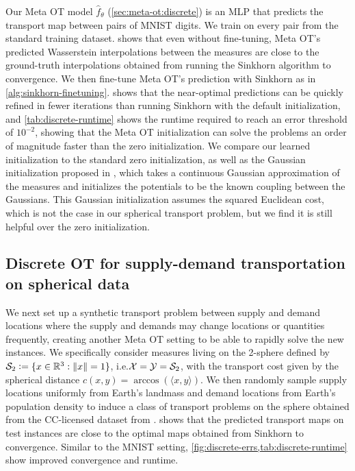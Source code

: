 \documentclass{article}
\newcommand{\ie}{i.e.\xspace}
\newcommand{\defeq}{\vcentcolon=}
\begin{document}
Our Meta OT model $\hat f_\theta$ (\cref{sec:meta-ot:discrete})
is an MLP that predicts the transport map between pairs of MNIST digits.
We train on every pair from the standard training dataset.
 shows that even without fine-tuning,
Meta OT's predicted Wasserstein interpolations between
the measures are close to the ground-truth interpolations
obtained from running the Sinkhorn algorithm to convergence.
We then fine-tune Meta OT's prediction with Sinkhorn as in
\cref{alg:sinkhorn-finetuning}.
 shows that the near-optimal predictions
can be quickly refined in fewer iterations than running
Sinkhorn with the default initialization,
and \cref{tab:discrete-runtime} shows the runtime required
to reach an error threshold of $10^{-2}$, showing that the Meta OT
initialization can solve the problems an order of magnitude
faster than the zero initialization.
We compare our learned initialization to the standard zero initialization,
as well as the Gaussian initialization proposed in \citet{thornton2022rethinking},
which takes a continuous Gaussian approximation of the measures and initializes
the potentials to be the known coupling between the Gaussians.
This Gaussian initialization assumes the squared Euclidean cost,
which is not the case in our spherical transport problem,
but we find it is still helpful over the zero initialization.

\subsection{Discrete OT for supply-demand transportation on spherical data}
\label{sec:exp:world}

We next set up a synthetic transport problem between supply and demand
locations where the supply and demands may change locations or quantities
frequently, creating another Meta OT setting to be able to rapidly solve
the new instances.
We specifically consider measures living on the 2-sphere defined by
$\gS_2\defeq\{x\in\R^3: \|x\|=1\}$, \ie ${\mathcal{X}}={\mathcal{Y}}={\mathcal{S}}_2$,
with the transport cost given by the spherical distance
$c(x,y)=\arccos(\langle x, y \rangle)$.
We then randomly sample supply locations uniformly from Earth's
landmass and demand locations from Earth's population density to
induce a class of transport problems on the sphere
obtained from the CC-licensed dataset from \citet{doxsey2015taking}.
 shows that the predicted transport maps
on test instances are close to the optimal maps obtained from
Sinkhorn to convergence.
Similar to the MNIST setting, \cref{fig:discrete-errs,tab:discrete-runtime}
show improved convergence and runtime.
\end{document}
